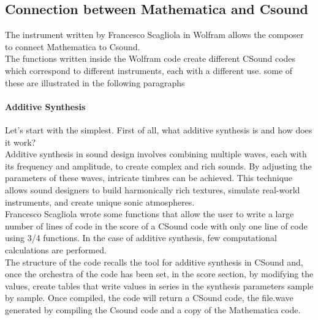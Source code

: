 		\subsection{Connection between Mathematica and Csound}
		The instrument written by Francesco Scagliola in Wolfram allows the composer to connect Mathematica to Csound. \\
		The functions written inside the Wolfram code create different CSound codes which correspond to different instruments, each with a different use. some of these are illustrated in the following paragraphs
		
		\paragraph{Additive Synthesis} Let's start with the simplest.
		First of all, what additive synthesis is and how does it work? \\
		Additive synthesis in sound design involves combining multiple waves, each with its frequency and amplitude, to create complex and rich sounds. By adjusting the parameters of these waves, intricate timbres can be achieved. This technique allows sound designers to build harmonically rich textures, simulate real-world instruments, and create unique sonic atmospheres. \\
		Francesco Scagliola wrote some functions that allow the user to write a large number of lines of code in the score of a CSound code with only one line of code using 3/4 functions. In the case of additive synthesis, few computational calculations are performed. \\
		The structure of the code recalls the tool for additive synthesis in CSound and, once the orchestra of the code has been set, in the score section, by modifying the values, create tables that write values ​​in series in the synthesis parameters sample by sample. Once compiled, the code will return a CSound code, the file.wave generated by compiling the Csound code and a copy of the Mathematica code.
		
